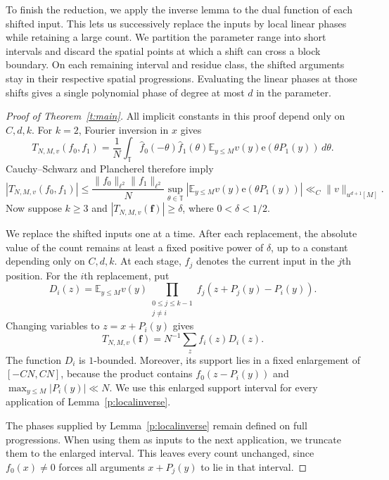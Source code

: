 \documentclass[12pt]{amsart}
\newcommand{\1}{\mathbf 1}
\newcommand{\e}{\mathrm e}
\theoremstyle{definition}
\begin{document}
To finish the reduction, we apply the inverse lemma to the dual
function of each shifted input. This lets us successively replace
the inputs by local linear phases while retaining a large count.
We partition the parameter range into short intervals and discard
the spatial points at which a shift can cross a block boundary.
On each remaining interval and residue class, the shifted arguments
stay in their respective spatial progressions. Evaluating the linear
phases at those shifts gives a single polynomial phase of degree
at most \(d\) in the parameter.

\begin{proof}[Proof of Theorem~\ref{t:main}]
All implicit constants in this proof depend only on $C,d,k$.
For $k=2$, Fourier inversion in $x$ gives
\[
 T_{N,M,v}(f_0,f_1)
 =\frac1N\int_{\mathbb T}\widehat f_0(-\theta)\widehat f_1(\theta)
       \mathbb E_{y\leq M}v(y)\e(\theta P_1(y))\,d\theta.
\]
Cauchy--Schwarz and Plancherel therefore imply
\[
 |T_{N,M,v}(f_0,f_1)|
 \leq \frac{\|f_0\|_{\ell^2}\|f_1\|_{\ell^2}}{N}
       \sup_{\theta\in\mathbb T}
       \left|\mathbb E_{y\leq M}v(y)\e(\theta P_1(y))\right|
 \ll_C \|v\|_{u^{d+1}[M]}.
\]
Now suppose $k\geq3$ and $|T_{N,M,v}(\mathbf f)|\geq\delta$,
where $0<\delta<1/2$.

We replace the shifted inputs one at a time. After each replacement,
the absolute value of the count remains at least a fixed positive
power of \(\delta\), up to a constant depending only on \(C,d,k\). At each stage, $f_j$ denotes the
current input in the $j$th position. For the $i$th replacement, put
\[
 D_i(z)=\mathbb E_{y\leq M}v(y)
       \prod_{\substack{0\leq j\leq k-1\\j\ne i}}
       f_j(z+P_j(y)-P_i(y)).
\]
Changing variables to $z=x+P_i(y)$ gives
$$T_{N,M,v}(\mathbf f)=N^{-1}\sum_z f_i(z)D_i(z).$$
The function $D_i$ is $1$-bounded. Moreover, its support lies in
a fixed enlargement of $[-CN,CN]$, because the product contains
$f_0(z-P_i(y))$ and $\max_{y\leq M}|P_i(y)|\ll N$.
We use this enlarged support interval for every application of
Lemma~\ref{p:localinverse}. 

The phases supplied by Lemma~\ref{p:localinverse} remain
defined on full progressions. When using them as inputs to the
next application, we truncate them to the enlarged interval.
This leaves every count unchanged, since $f_0(x)\ne0$ forces all
arguments $x+P_j(y)$ to lie in that interval.


\end{proof}
\end{document}
